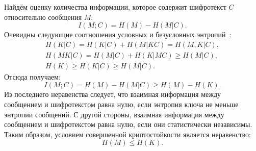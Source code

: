Найдём оценку количества информации, которое содержит шифротекст $C$ относительно сообщения $M$:
\[ I(M; C) = H(M) - H(M | C). \]
Очевидны следующие соотношения условных и безусловных энтропий~\cite{GabPil:2007}:
\begin{gather*}
H(K|C)=H(K|C)+H(M|KC)=H(M,K|C),\\
H(MK|C)=H(M|C)+H(K|MC)\geq H(M|C),\\
H(K)\geq H(K|C)\geq H(M|C).
\end{gather*}
Отсюда получаем:
 \[ I(M; C) = H(M) - H(M | C)\geq H(M)-H(K). \]
Из последнего неравенства следует, что взаимная информация между сообщением и шифротекстом равна нулю, если энтропия ключа не меньше энтропии сообщений. С другой стороны, взаимная информация между сообщением и шифротекстом равна нулю, если они статистически независимы. Таким образом, условием совершенной криптостойкости является неравенство:
\[ H(M) \leq H(K).\]




